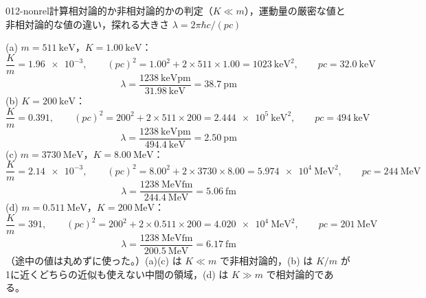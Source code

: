 \documentclass[uplatex,dvipdfmx,a4paper,11pt]{jsarticle}
\begin{document}
\begin{mondai}{012-nonrel}{計算}{相対論的か非相対論的かの判定（$K\ll m$），運動量の厳密な値と非相対論的な値の違い，探れる大きさ $\lambda=2\pi\hbar c/(pc)$}
\begin{tadashii}
(a) $m=\qty{511}{\kilo\electronvolt}$，$K=\qty{1.00}{\kilo\electronvolt}$：
\[ \frac{K}{m}=\num{1.96e-3},\qquad (pc)^2=1.00^2+2\times511\times1.00=1023\ \unit{\kilo\electronvolt\squared},\qquad pc=\qty{32.0}{\kilo\electronvolt} \]
\[ \lambda=\frac{\qty{1238}{\kilo\electronvolt\pico\metre}}{\qty{31.98}{\kilo\electronvolt}}=\qty{38.7}{\pico\metre} \]
(b) $K=\qty{200}{\kilo\electronvolt}$：
\[ \frac{K}{m}=0.391,\qquad (pc)^2=200^2+2\times511\times200=\num{2.444e5}\ \unit{\kilo\electronvolt\squared},\qquad pc=\qty{494}{\kilo\electronvolt} \]
\[ \lambda=\frac{\qty{1238}{\kilo\electronvolt\pico\metre}}{\qty{494.4}{\kilo\electronvolt}}=\qty{2.50}{\pico\metre} \]
(c) $m=\qty{3730}{\mega\electronvolt}$，$K=\qty{8.00}{\mega\electronvolt}$：
\[ \frac{K}{m}=\num{2.14e-3},\qquad (pc)^2=8.00^2+2\times3730\times8.00=\num{5.974e4}\ \unit{\mega\electronvolt\squared},\qquad pc=\qty{244}{\mega\electronvolt} \]
\[ \lambda=\frac{\qty{1238}{\mega\electronvolt\femto\metre}}{\qty{244.4}{\mega\electronvolt}}=\qty{5.06}{\femto\metre} \]
(d) $m=\qty{0.511}{\mega\electronvolt}$，$K=\qty{200}{\mega\electronvolt}$：
\[ \frac{K}{m}=391,\qquad (pc)^2=200^2+2\times0.511\times200=\num{4.020e4}\ \unit{\mega\electronvolt\squared},\qquad pc=\qty{201}{\mega\electronvolt} \]
\[ \lambda=\frac{\qty{1238}{\mega\electronvolt\femto\metre}}{\qty{200.5}{\mega\electronvolt}}=\qty{6.17}{\femto\metre} \]
（途中の値は丸めずに使った。）(a)(c) は $K\ll m$ で非相対論的，(b) は $K/m$ が1に近くどちらの近似も使えない中間の領域，(d) は $K\gg m$ で相対論的である。


\end{tadashii}
\end{mondai}
\end{document}
